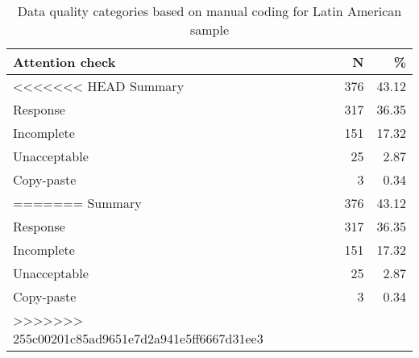 \begin{table}

\caption{Data quality categories based on manual coding for Latin American sample}
\centering
\begin{tabular}[t]{lrr}
\toprule
Attention check & N & \%\\
\midrule
<<<<<<< HEAD
Summary & 376 & 43.12\\
Response & 317 & 36.35\\
Incomplete & 151 & 17.32\\
Unacceptable & 25 & 2.87\\
Copy-paste & 3 & 0.34\\
=======
Summary & 376 & \num{43.12}\\
Response & 317 & \num{36.35}\\
Incomplete & 151 & \num{17.32}\\
Unacceptable & 25 & \num{2.87}\\
Copy-paste & 3 & \num{0.34}\\
>>>>>>> 255c00201c85ad9651e7d2a941e5ff6667d31ee3
\bottomrule
\end{tabular}
\end{table}
